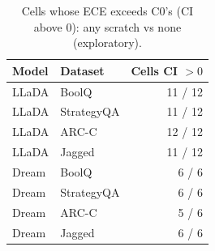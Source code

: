 \begin{table}[h!]
\centering
\small
\caption{Cells whose ECE exceeds C0's (CI above 0): any scratch vs none (exploratory).}
\label{tab:anythinking}
\begin{tabular}{llr}
\toprule
Model & Dataset & Cells CI $>0$ \\
\midrule
LLaDA & BoolQ & 11 / 12 \\
LLaDA & StrategyQA & 11 / 12 \\
LLaDA & ARC-C & 12 / 12 \\
LLaDA & Jagged & 11 / 12 \\
Dream & BoolQ & 6 / 6 \\
Dream & StrategyQA & 6 / 6 \\
Dream & ARC-C & 5 / 6 \\
Dream & Jagged & 6 / 6 \\
\bottomrule
\end{tabular}
\end{table}
